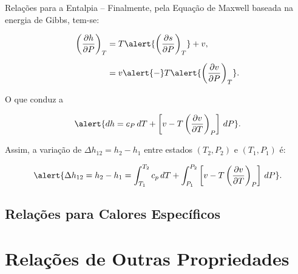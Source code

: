\begin{frame}[allowframebreaks]{Relações para a Entalpia --}
        \pagebreak
        Finalmente, pela Equação de Maxwell baseada na energia de Gibbs, tem-se:

        \begin{align*}
            \left(\frac{\partial h}{\partial P}\right)_T
            &= T\alert{\left(\frac{\partial s}{\partial P}\right)_T} + v,
            \\[\medskipamount]
            &= v \alert{-} T\alert{\left(\frac{\partial v}{\partial P}\right)_T}.
        \end{align*}

        O que conduz a

        \begin{equation*}
            \alert{
                dh = c_P\,dT +
                \left[
                    v -
                    T\left(
                        \frac{\partial v}{\partial T}
                    \right)_P
                \right]\,dP
            }.
        \end{equation*}

        \pagebreak
        Assim, a variação de \alert{$\Delta h_{12} = h_2 - h_1$} entre estados \alert{$(T_2,
        P_2)$} e \alert{$(T_1, P_1)$} é: \vspace*\bigskipamount

        \begin{equation*}
            \alert{
                \Delta h_{12} = h_2 - h_1 =
                    \int_{T_1}^{T_2}
                        c_p\,dT +
                    \int_{P_1}^{P_2}
                        \left[
                            v - T\left(
                                \frac{\partial v}{\partial T}
                            \right)_P
                        \right]\,dP
            }.
        \end{equation*}

    \end{frame}

\subsection{Relações para Calores Específicos}

\section{Relações de Outras Propriedades}

